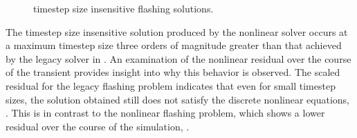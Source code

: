 \begin{figure}[h!t]
\centering
{}
\caption{timestep size insensitive flashing solutions.}
\label{fig:flashing_res_comp_1}
\end{figure}

The timestep size insensitive solution produced by the nonlinear solver occurs at a maximum timestep size three orders of magnitude greater than that achieved by the legacy solver in \cobra{}.
An examination of the nonlinear residual over the course of the transient provides insight into why this behavior is observed.
The scaled residual for the legacy flashing problem indicates that even for small timestep sizes, the solution obtained still does not satisfy the discrete nonlinear equations, .
This is in contrast to the nonlinear flashing problem, which shows a lower residual over the course of the simulation, .

